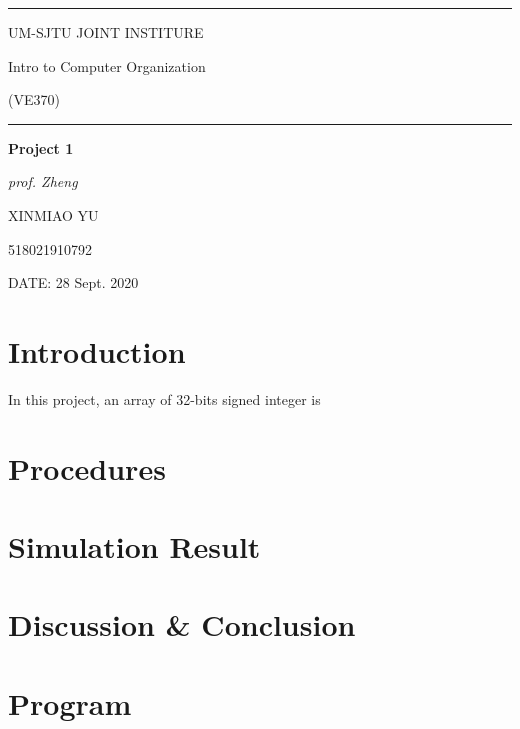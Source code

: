 \documentclass[a4paper]{article}
\begin{document}
	\begin{titlepage}
	\vspace{200pt}


		\begin{center}
		\rule[0pt]{12cm}{0.05em}
		
		 \Large{UM-SJTU \quad JOINT \quad INSTITURE}
		 \vspace{8pt}
		
		 
		 Intro to Computer Organization
		 
		 (VE370)		 
		 
		 \rule[0pt]{12cm}{0.05em}
		 
		 \vspace{50pt}
		 
		  {\fontsize{15}{30}\selectfont \textbf{Project 1}}
		  \vspace{8pt}

		  {\fontsize{15}{30}\selectfont \textit{prof. Zheng}}
		  
		 
		 \vspace{250pt}

		 
		

		 
		XINMIAO YU 
		
		518021910792 
		\vspace{5pt}
		
		\vspace{80pt}
		 \end{center}
		 
		DATE: 28 Sept. 2020
	\end{titlepage}
	
	\pagestyle{plain}
	
	\section{Introduction}
In this project, an array of 32-bits signed integer is 

	\section{Procedures}
	
	
	\section{Simulation Result}
	
	\section{Discussion \& Conclusion}
	

	
	
	\appendix
	\section{Program}
	
\end{document}

